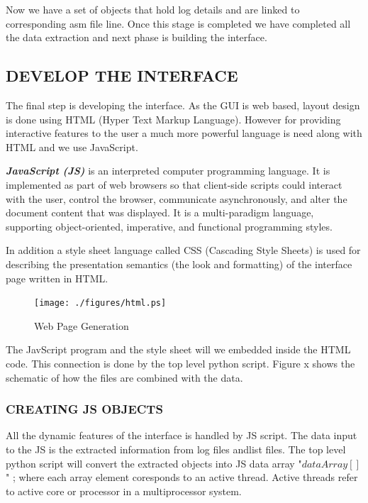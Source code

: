 \vspace{1.5cm}
Now we have a set of objects that hold log details and are linked to corresponding asm file line. Once this stage is completed we have completed all the data extraction and next phase is building the interface.

\subsection {DEVELOP THE INTERFACE}

The final step is developing the interface. As the GUI is web based, layout design is done using HTML (Hyper Text Markup Language). However for providing interactive features to the user a much more powerful language is need along with HTML and we use JavaScript.

\emph {\bf JavaScript (JS)} is an interpreted computer programming language. It is  implemented as part of web browsers so that client-side scripts could interact with the user, control the browser, communicate asynchronously, and alter the document content that was displayed. It is a multi-paradigm language, supporting object-oriented, imperative, and functional programming styles.

In addition a style sheet language called CSS (Cascading Style Sheets) is used for describing the presentation semantics (the look and formatting) of the interface page written in HTML.
\begin{figure}[H]
\centering
\texttt{[image: ./figures/html.ps]}
\caption{Web Page Generation}
\label{fig:html.ps}
\end{figure}


The JavScript program and the style sheet will we embedded inside the HTML code. This connection is done by the top level python script. Figure x shows the schematic of how the files are combined with the data.



\subsubsection{CREATING JS OBJECTS}
All the dynamic features of the interface is handled by JS script. The data input to the JS is the extracted information from log files andlist files. The top level python script will convert the extracted objects into JS data array "$dataArray[]$" ; where each array element coresponds to an active thread. Active threads refer to active core or processor in a multiprocessor system.  

